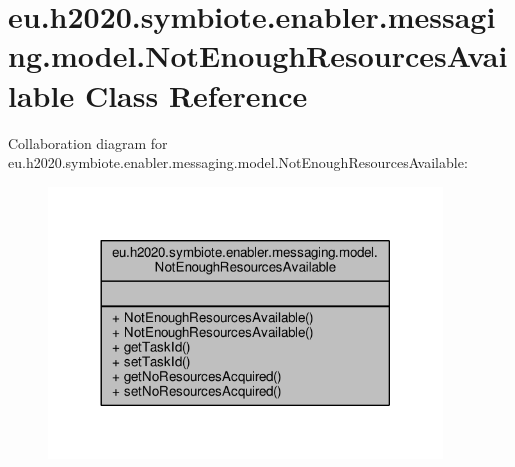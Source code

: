 \hypertarget{classeu_1_1h2020_1_1symbiote_1_1enabler_1_1messaging_1_1model_1_1NotEnoughResourcesAvailable}{}\section{eu.\+h2020.\+symbiote.\+enabler.\+messaging.\+model.\+Not\+Enough\+Resources\+Available Class Reference}
\label{classeu_1_1h2020_1_1symbiote_1_1enabler_1_1messaging_1_1model_1_1NotEnoughResourcesAvailable}


Collaboration diagram for eu.\+h2020.\+symbiote.\+enabler.\+messaging.\+model.\+Not\+Enough\+Resources\+Available\+:
\nopagebreak
\begin{figure}[H]
\begin{center}
\leavevmode
\includegraphics[width=296pt]{classeu_1_1h2020_1_1symbiote_1_1enabler_1_1messaging_1_1model_1_1NotEnoughResourcesAvailable__coll__graph}
\end{center}
\end{figure}
